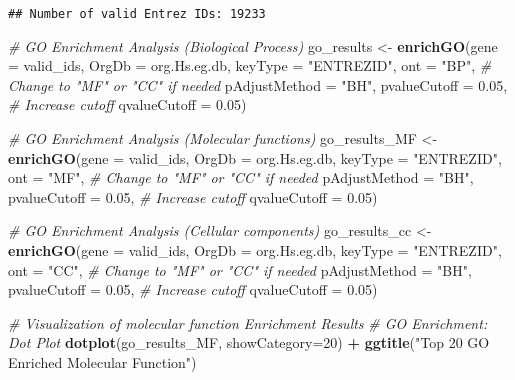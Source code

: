 \documentclass[
]{article}
\newenvironment{Shaded}{\begin{snugshade}}{\end{snugshade}}
\newcommand{\AttributeTok}[1]{\textcolor[rgb]{0.13,0.29,0.53}{#1}}
\newcommand{\CommentTok}[1]{\textcolor[rgb]{0.56,0.35,0.01}{\textit{#1}}}
\newcommand{\DecValTok}[1]{\textcolor[rgb]{0.00,0.00,0.81}{#1}}
\newcommand{\FloatTok}[1]{\textcolor[rgb]{0.00,0.00,0.81}{#1}}
\newcommand{\FunctionTok}[1]{\textcolor[rgb]{0.13,0.29,0.53}{\textbf{#1}}}
\newcommand{\NormalTok}[1]{#1}
\newcommand{\OtherTok}[1]{\textcolor[rgb]{0.56,0.35,0.01}{#1}}
\newcommand{\SpecialCharTok}[1]{\textcolor[rgb]{0.81,0.36,0.00}{\textbf{#1}}}
\newcommand{\StringTok}[1]{\textcolor[rgb]{0.31,0.60,0.02}{#1}}
\begin{document}
\begin{verbatim}
## Number of valid Entrez IDs: 19233
\end{verbatim}

\begin{Shaded}
\begin{Highlighting}[]
\CommentTok{\# GO Enrichment Analysis (Biological Process)}
\NormalTok{go\_results }\OtherTok{\textless{}{-}} \FunctionTok{enrichGO}\NormalTok{(}\AttributeTok{gene =}\NormalTok{ valid\_ids,}
                       \AttributeTok{OrgDb =}\NormalTok{ org.Hs.eg.db, }
                       \AttributeTok{keyType =} \StringTok{"ENTREZID"}\NormalTok{, }
                       \AttributeTok{ont =} \StringTok{"BP"}\NormalTok{,  }\CommentTok{\# Change to "MF" or "CC" if needed}
                       \AttributeTok{pAdjustMethod =} \StringTok{"BH"}\NormalTok{, }
                       \AttributeTok{pvalueCutoff =} \FloatTok{0.05}\NormalTok{,  }\CommentTok{\# Increase cutoff}
                       \AttributeTok{qvalueCutoff =} \FloatTok{0.05}\NormalTok{)}

\CommentTok{\# GO Enrichment Analysis (Molecular functions)}
\NormalTok{go\_results\_MF }\OtherTok{\textless{}{-}} \FunctionTok{enrichGO}\NormalTok{(}\AttributeTok{gene =}\NormalTok{ valid\_ids,}
                          \AttributeTok{OrgDb =}\NormalTok{ org.Hs.eg.db, }
                          \AttributeTok{keyType =} \StringTok{"ENTREZID"}\NormalTok{, }
                          \AttributeTok{ont =} \StringTok{"MF"}\NormalTok{,  }\CommentTok{\# Change to "MF" or "CC" if needed}
                          \AttributeTok{pAdjustMethod =} \StringTok{"BH"}\NormalTok{, }
                          \AttributeTok{pvalueCutoff =} \FloatTok{0.05}\NormalTok{,  }\CommentTok{\# Increase cutoff}
                          \AttributeTok{qvalueCutoff =} \FloatTok{0.05}\NormalTok{)}

\CommentTok{\# GO Enrichment Analysis (Cellular components)}
\NormalTok{go\_results\_cc }\OtherTok{\textless{}{-}} \FunctionTok{enrichGO}\NormalTok{(}\AttributeTok{gene =}\NormalTok{ valid\_ids,}
                          \AttributeTok{OrgDb =}\NormalTok{ org.Hs.eg.db, }
                          \AttributeTok{keyType =} \StringTok{"ENTREZID"}\NormalTok{, }
                          \AttributeTok{ont =} \StringTok{"CC"}\NormalTok{,  }\CommentTok{\# Change to "MF" or "CC" if needed}
                          \AttributeTok{pAdjustMethod =} \StringTok{"BH"}\NormalTok{, }
                          \AttributeTok{pvalueCutoff =} \FloatTok{0.05}\NormalTok{,  }\CommentTok{\# Increase cutoff}
                          \AttributeTok{qvalueCutoff =} \FloatTok{0.05}\NormalTok{)}

\CommentTok{\# Visualization of molecular function Enrichment Results}
\CommentTok{\# GO Enrichment: Dot Plot}
\FunctionTok{dotplot}\NormalTok{(go\_results\_MF, }\AttributeTok{showCategory=}\DecValTok{20}\NormalTok{) }\SpecialCharTok{+} \FunctionTok{ggtitle}\NormalTok{(}\StringTok{"Top 20 GO Enriched Molecular Function"}\NormalTok{)}
\end{Highlighting}
\end{Shaded}
\end{document}
